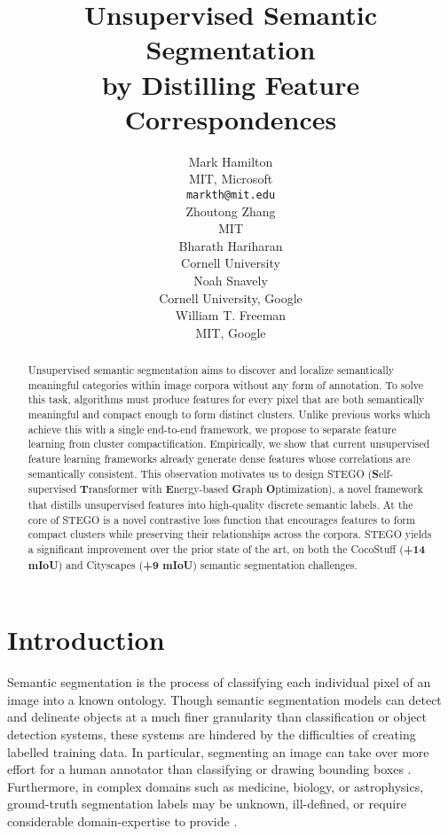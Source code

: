 \documentclass{article} \usepackage{iclr2022_conference,times}
\title{Unsupervised Semantic Segmentation \\ by Distilling Feature Correspondences}
\author{Mark Hamilton \\
MIT, Microsoft\\
\texttt{markth@mit.edu} \\
\And
Zhoutong Zhang \\
MIT \\
\And
Bharath Hariharan \\
Cornell University \\
\AND
Noah Snavely \\
Cornell University, Google \\
\And 
William T. Freeman \\
MIT, Google \\
}
\begin{document}
\maketitle
\vspace{-.2in}


\begin{abstract}
Unsupervised semantic segmentation aims to discover and localize semantically meaningful categories within image corpora without any form of annotation. To solve this task, algorithms must produce features for every pixel that are both semantically meaningful and compact enough to form distinct clusters. Unlike previous works which achieve this with a single end-to-end framework, we propose to separate feature learning from cluster compactification. Empirically, we show that current unsupervised feature learning frameworks already generate dense features whose correlations are semantically consistent. This observation motivates us to design STEGO (\textbf{S}elf-supervised \textbf{T}ransformer with \textbf{E}nergy-based \textbf{G}raph \textbf{O}ptimization), a novel framework that distills unsupervised features into high-quality discrete semantic labels. At the core of STEGO is a novel contrastive loss function that encourages features to form compact clusters while preserving their relationships across the corpora.
STEGO yields a significant improvement over the prior state of the art, on both the CocoStuff (\textbf{+14 mIoU}) and Cityscapes (\textbf{+9 mIoU}) semantic segmentation challenges.  



\end{abstract}


\section{Introduction}

Semantic segmentation is the process of classifying each individual pixel of an image into a known ontology. Though semantic segmentation models can detect and delineate objects at a much finer granularity than classification or object detection systems, these systems are hindered by the difficulties of creating labelled training data. In particular, segmenting an image can take over  more effort for a human annotator than classifying or drawing bounding boxes \citep{zlateski2018importance}. Furthermore, in complex domains such as medicine, biology, or astrophysics, ground-truth segmentation labels may be unknown, ill-defined, or require considerable domain-expertise to provide \citep{yu2018methods}. 
\end{document}
